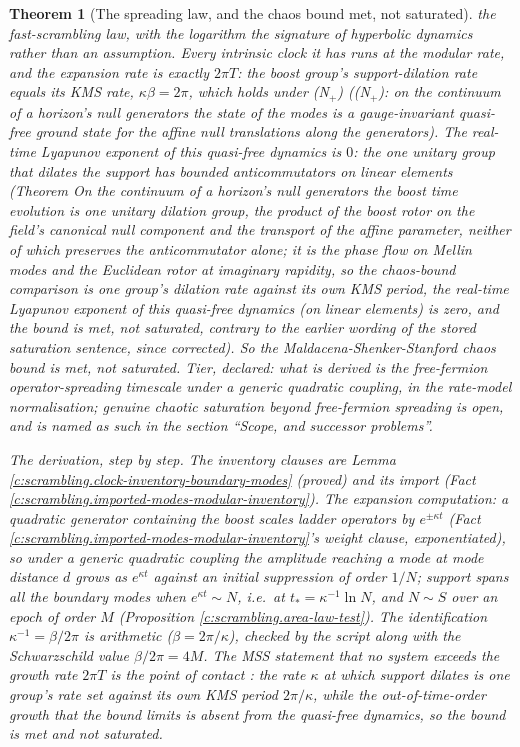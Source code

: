 \documentclass[11pt]{article}
\newtheorem{theorem}{Theorem}[section]
\theoremstyle{definition}
\theoremstyle{plain}
\begin{document}
\begin{theorem}[The spreading law, and the chaos bound met, not saturated]
the fast-scrambling law, with the logarithm the signature of hyperbolic dynamics rather than an assumption. Every intrinsic clock it has runs at the modular rate, and the expansion rate is exactly $2\pi T$: the boost group's support-dilation rate equals its KMS rate, $\kappa\beta = 2\pi$, which holds under (N$_{+}$) (\emph{(N$_{+}$): on the continuum of a horizon's null generators the state of the modes is a gauge-invariant quasi-free ground state for the affine null translations along the generators}). The real-time Lyapunov exponent of this quasi-free dynamics is $0$: the one unitary group that dilates the support has bounded anticommutators on linear elements (Theorem \emph{On the continuum of a horizon's null generators the boost time evolution is one unitary dilation group, the product of the boost rotor on the field's canonical null component and the transport of the affine parameter, neither of which preserves the anticommutator alone; it is the phase flow on Mellin modes and the Euclidean rotor at imaginary rapidity, so the chaos-bound comparison is one group's dilation rate against its own KMS period, the real-time Lyapunov exponent of this quasi-free dynamics (on linear elements) is zero, and the bound is met, not saturated, contrary to the earlier wording of the stored saturation sentence, since corrected}). So the Maldacena-Shenker-Stanford chaos bound is met, not saturated. \emph{Tier, declared:} what is derived is the free-fermion operator-spreading timescale under a generic quadratic coupling, in the rate-model normalisation; genuine chaotic saturation beyond free-fermion spreading is open, and is named as such in the section ``Scope, and successor problems''.

\smallskip
\noindent\emph{The derivation, step by step.} The inventory clauses are Lemma \ref{c:scrambling.clock-inventory-boundary-modes} (proved) and its import (Fact \ref{c:scrambling.imported-modes-modular-inventory}). The expansion computation: a quadratic generator containing the boost scales ladder operators by $e^{\pm\kappa t}$ (Fact \ref{c:scrambling.imported-modes-modular-inventory}'s weight clause, exponentiated), so under a generic quadratic coupling the amplitude reaching a mode at mode distance $d$ grows as $e^{\kappa t}$ against an initial suppression of order $1/N$; support spans all the boundary modes when $e^{\kappa t} \sim N$, i.e.\ at $t_* = \kappa^{-1}\ln N$, and $N \sim S$ over an epoch of order $M$ (Proposition \ref{c:scrambling.area-law-test}). The identification $\kappa^{-1} = \beta/2\pi$ is arithmetic ($\beta = 2\pi/\kappa$), checked by the script along with the Schwarzschild value $\beta/2\pi = 4M$. The MSS statement that no system exceeds the growth rate $2\pi T$ is the point of contact \cite{MSS2016}: the rate $\kappa$ at which support dilates is one group's rate set against its own KMS period $2\pi/\kappa$, while the out-of-time-order growth that the bound limits is absent from the quasi-free dynamics, so the bound is met and not saturated.
\end{theorem}
\end{document}
